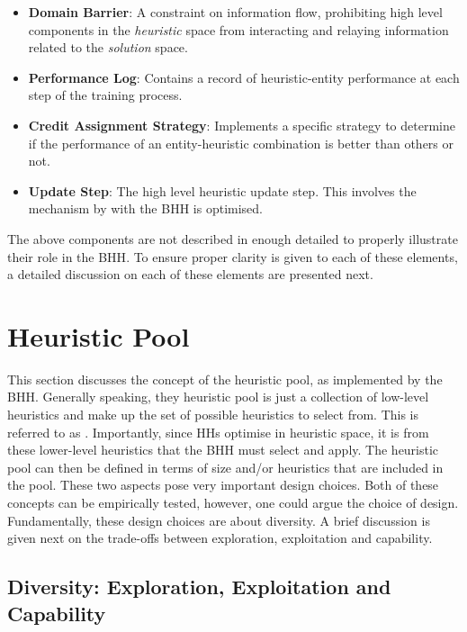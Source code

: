 \begin{itemize}
      \item \textbf{Domain Barrier}: A constraint on information flow, prohibiting high level components in the \textit{heuristic} space from interacting and relaying information related to the \textit{solution} space.

      \item \textbf{Performance Log}: Contains a record of heuristic-entity performance at each step of the training process.

      \item \textbf{Credit Assignment Strategy}: Implements a specific strategy to determine if the performance of an entity-heuristic combination is better than others or not.

      \item \textbf{Update Step}: The high level heuristic update step. This involves the mechanism by with the \ac{BHH} is optimised.
\end{itemize}

The above components are not described in enough detailed to properly illustrate their role in the \Ac{BHH}. To ensure proper clarity is given to each of these elements, a detailed discussion on each of these elements are presented next.


\section{Heuristic Pool}
\label{sec:bhh:heuristic_pool}

This section discusses the concept of the heuristic pool, as implemented by the \ac{BHH}. Generally speaking, they heuristic pool is just a collection of low-level heuristics and make up the set of possible heuristics to select from. This is referred to as . Importantly, since \acp{HH} optimise in heuristic space, it is from these lower-level heuristics that the \ac{BHH} must select and apply. The heuristic pool can then be defined in terms of size and/or heuristics that are included in the pool. These two aspects pose very important design choices. Both of these concepts can be empirically tested, however, one could argue the choice of design. Fundamentally, these design choices are about diversity. A brief discussion is given next on the trade-offs between exploration, exploitation and capability.

\subsection{Diversity: Exploration, Exploitation and Capability}
\label{sec:bhh:heuristic_pool:diversity}

